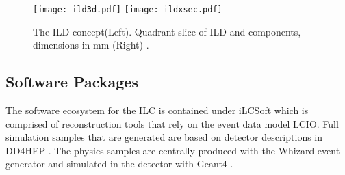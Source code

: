 \begin{figure}

\texttt{[image: ild3d.pdf]}
\texttt{[image: ildxsec.pdf]}
\caption{The ILD concept(Left). Quadrant slice of ILD and components, dimensions in mm (Right) \cite{tdrdet}.}
\label{fig:ilddet}
\end{figure}
\subsection{Software Packages}
\label{ilcsoft}

The software ecosystem for the ILC is contained under iLCSoft \cite{ilcsoft} which is comprised of reconstruction tools that rely on the event data model LCIO\cite{lcio}. Full simulation samples that are generated are based on detector descriptions in DD4HEP \cite{dd4hep}. The physics samples are centrally produced with the Whizard event generator \cite{ whizard} and simulated in the detector with Geant4 \cite{geant4}.


